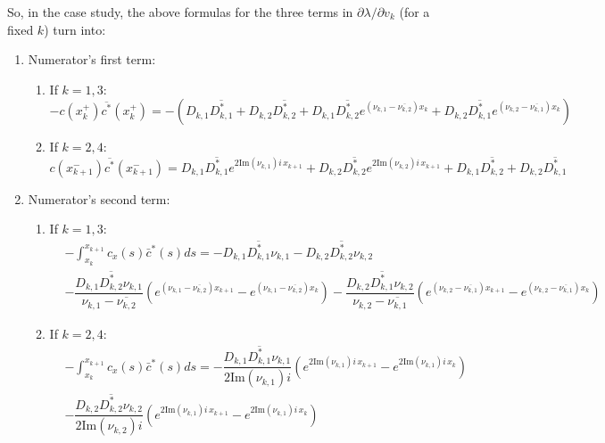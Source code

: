 \documentclass[a4paper]{article}
\def\Im{{\textrm{Im}}}
\newcommand{\X}[3]{#1_{#3,#2}}
\newcommand{\Xe}[3]{#1^*_{#3,#2}}
\numberwithin{equation}{section}
\begin{document}
So, in the case study, the above formulas for the three terms in $\partial \lambda/\partial v_k$ (for a fixed $k$) turn into:
\begin{enumerate}
\item Numerator's first term:
    \begin{enumerate}
    \item If $k=1,3$:
    $$-c(x_k^+)\overline{c^*}(x_k^+) = -\left( \X{D}{1}{k} \overline{\Xe{D}{1}{k}}  + \X{D}{2}{k} \overline{\Xe{D}{2}{k}}  +\X{D}{1}{k} \overline{\Xe{D}{2}{k}} e^{\left( \X{\nu}{1}{k}-\overline{\X{\nu}{2}{k}}\right) x_k} +\X{D}{2}{k} \overline{\Xe{D}{1}{k}} e^{\left( \X{\nu}{2}{k}-\overline{\X{\nu}{1}{k}}\right) x_k}  \right)$$
    \item If $k=2,4$:
     $$c(x_{k+1}^-)\overline{c^*}(x_{k+1}^-) =  \X{D}{1}{k} \overline{\Xe{D}{1}{k}} e^{ 2\Im(\X{\nu}{1}{k}) i\, x_{k+1}} + \X{D}{2}{k} \overline{\Xe{D}{2}{k}} e^{2\Im(\X{\nu}{2}{k}) i\, x_{k+1}} +\X{D}{1}{k} \overline{\Xe{D}{2}{k}}  +\X{D}{2}{k} \overline{\Xe{D}{1}{k}}   $$
   \end{enumerate}
\item Numerator's second term:
    \begin{enumerate}
    \item If $k=1,3$:
    \begin{align*}
     &- \int_{x_k}^{x_{k+1}}c_x(s) \bar{c}^*(s)ds =
     - \X{D}{1}{k} \overline{\Xe{D}{1}{k}}\X{\nu}{1}{k}  - \X{D}{2}{k} \overline{\Xe{D}{2}{k}}\X{\nu}{2}{k}\\
    & -\dfrac{\X{D}{1}{k} \overline{\Xe{D}{2}{k}}\X{\nu}{1}{k}}{\X{\nu}{1}{k}-\overline{\X{\nu}{2}{k}}} \left(e^{\left( \X{\nu}{1}{k}-\overline{\X{\nu}{2}{k}}\right) x_{k+1}} -e^{\left( \X{\nu}{1}{k}-\overline{\X{\nu}{2}{k}}\right) x_{k}}\right)
    -\dfrac{\X{D}{2}{k} \overline{\Xe{D}{1}{k}}\X{\nu}{2}{k}}{\X{\nu}{2}{k}-\overline{\X{\nu}{1}{k}}} \left(e^{\left( \X{\nu}{2}{k}-\overline{\X{\nu}{1}{k}}\right) x_{k+1}}-e^{\left( \X{\nu}{2}{k}-\overline{\X{\nu}{1}{k}}\right) x_k}\right)
    \end{align*}
    \item If $k=2,4$:
    \begin{align*}
    & - \int_{x_k}^{x_{k+1}}c_x(s) \bar{c}^*(s)ds =
      - \dfrac{\X{D}{1}{k} \overline{\Xe{D}{1}{k}}\X{\nu}{1}{k}}{2\Im(\X{\nu}{1}{k}) i} \left(e^{2\Im(\X{\nu}{1}{k}) i\,x_{k+1}}-e^{2\Im(\X{\nu}{1}{k}) i\,x_{k}}  \right)\\
        &-\dfrac{\X{D}{2}{k} \overline{\Xe{D}{2}{k}}\X{\nu}{2}{k}}{2\Im(\X{\nu}{2}{k}) i}\left( e^{2\Im(\X{\nu}{1}{k}) i\, x_{k+1}}-e^{2\Im(\X{\nu}{1}{k}) i\, x_{k}} \right)

\end{align*}
\end{enumerate}
\end{enumerate}
\end{document}
